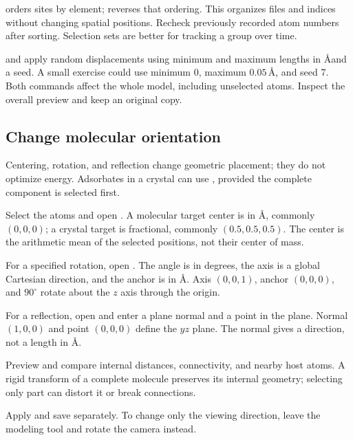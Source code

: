  orders sites by element;  reverses that ordering. This organizes files and indices without changing spatial positions. Recheck previously recorded atom numbers after sorting. Selection sets are better for tracking a group over time.

 and  apply random displacements using minimum and maximum lengths in \AA and a seed. A small exercise could use minimum 0, maximum $0.05\,\text{\AA}$, and seed 7. Both commands affect the whole model, including unselected atoms. Inspect the overall preview and keep an original copy.

\subsection{Change molecular orientation}\label{sec:orientation-reference}

Centering, rotation, and reflection change geometric placement; they do not optimize energy. Adsorbates in a crystal can use , provided the complete component is selected first.



\begin{steps}
  \item Select the atoms and open . A molecular target center is in \AA, commonly \((0,0,0)\); a crystal target is fractional, commonly \((0.5,0.5,0.5)\). The center is the arithmetic mean of the selected positions, not their center of mass.
  \item For a specified rotation, open . The angle is in degrees, the axis is a global Cartesian direction, and the anchor is in \AA. Axis \((0,0,1)\), anchor \((0,0,0)\), and $90^\circ$ rotate about the $z$ axis through the origin.
  \item For a reflection, open  and enter a plane normal and a point in the plane. Normal \((1,0,0)\) and point \((0,0,0)\) define the $yz$ plane. The normal gives a direction, not a length in \AA.
  \item Preview and compare internal distances, connectivity, and nearby host atoms. A rigid transform of a complete molecule preserves its internal geometry; selecting only part can distort it or break connections.
  \item Apply and save separately. To change only the viewing direction, leave the modeling tool and rotate the camera instead.
\end{steps}

